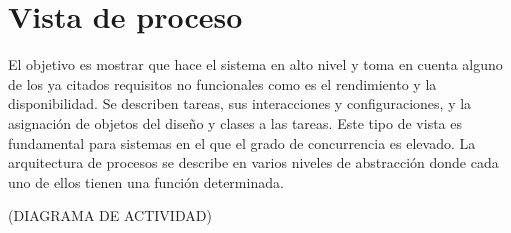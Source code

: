 \chapter{Vista de proceso}
El objetivo es mostrar que hace el sistema en alto nivel y toma en cuenta alguno de los ya citados requisitos no funcionales como es el rendimiento y la disponibilidad. Se describen tareas, sus interacciones y configuraciones, y la asignaci\'on de objetos del dise\~no y clases a las tareas. 
Este tipo de vista es fundamental para sistemas en el que el grado de concurrencia es elevado.
La arquitectura de procesos se describe en varios niveles de abstracci\'on donde cada uno de ellos tienen una funci\'on determinada.

(DIAGRAMA DE ACTIVIDAD)